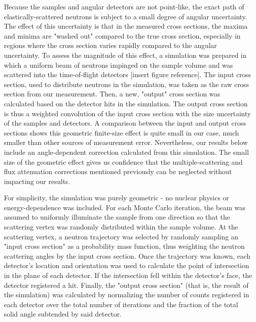 Because the samples and angular detectors are not point-like, the exact
path of elastically-scattered neutrons is subject to a small degree of angular
uncertainty. The effect of this uncertainty is that in the measured cross
sections, the maxima and minima are "washed out" compared to the true cross
section, especially in regions where the cross section varies rapidly compared
to the angular uncertainty. To assess the magnitude of this effect, a 
simulation was prepared in which a uniform beam of neutrons
impinged on the sample volume and was scattered into the time-of-flight
detectors [insert figure reference].
The input cross section, used to distribute neutrons in the simulation, was
taken as the raw cross section from our measurement. Then, a new, "output"
cross section was calculated based on the detector hits in the simulation. The
output cross section is thus a weighted convolution of the input cross section
with the size uncertainty of the samples and detectors.
A comparison between the input and output cross
sections shows this geometric finite-size effect is quite small in our case, much smaller
than other sources of measurement error. Nevertheless, our results below include an
angle-dependent correction calculated from this simulation. The small size of
the geometric effect gives us confidence that the multiple-scattering and flux
attenuation corrections mentioned previously can be neglected without impacting
our results.

For simplicity, the simulation was purely geometric - no nuclear physics or
energy-dependence was included. For each Monte Carlo iteration, the beam was
assumed to uniformly illuminate
the sample from one direction so that the scattering vertex was randomly
distributed within the sample volume. At the scattering vertex, a neutron
trajectory was selected by randomly sampling an "input cross section" as a
probability mass function, thus weighting the neutron scattering angles by the
input cross section.  Once the trajectory was known, each detector's location
and orientation was used to calculate the point of intersection in the plane of each detector. If the
intersection fell within the detector's face, the detector registered a hit.
Finally, the "output cross section" (that is, the result of the simulation)
was calculated by normalizing the number of counts registered in each detector
over the total number of iterations and the fraction of the total solid angle
subtended by said detector.

